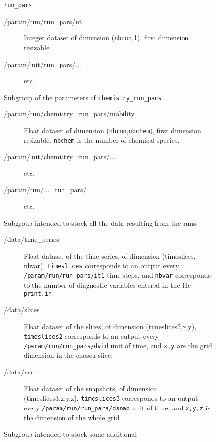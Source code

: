 \documentclass[a4paper,12pt]{article}
\begin{document}
\begin{figure}[p]
{\begin{description}
\begin{description}
\begin{description}
\begin{description}
        \texttt{run\_pars} 
        \begin{description}
        \item[/param/run/run\_pars/nt] Integer dataset of
            dimension (\texttt{nbrun},1), first dimension resizable
        \item[/param/init/run\_pars/...] etc.
        \end{description}
      \item[/param/run/chemistry\_run\_pars/] Subgroup of the
        parameters of \texttt{chemistry\_run\_pars} 
        \begin{description}
        \item[/param/run/chemistry\_run\_pars/mobility] Float dataset of
            dimension (\texttt{nbrun},\texttt{nbchem}), first
            dimension resizable. \texttt{nbchem} is the number of
            chemical species.
        \item[/param/init/chemistry\_run\_pars/...] etc.
      \item[/param/run/...\_run\_pars/] etc.
        \end{description}
      \end{description}
    \end{description}
  \item[/data/] Subgroup intended to stock all the data resulting from
    the runs.
    \begin{description}
    \item[/data/time\_series] Float dataset of the time series, of
      dimension (timeslices, nbvar),  \texttt{timeslices} corresponds
      to an output every \texttt{/param/run/run\_pars/it1} time
      steps, and \texttt{nbvar} corresponds to the number of
      diagnostic variables entered in the file \texttt{print.in}
    \item[/data/slices] Float dataset of the slices, of dimension
      (timeslices2,x,y), \texttt{timeslices2} corresponds to an output
      every \texttt{/param/run/run\_pars/dvid} unit of time, and
      \texttt{x,y} are the grid dimension in the chosen slice.
    \item[/data/var] Float dataset of the snapshots, of dimension
      (timeslices3,x,y,z), \texttt{timeslices3} corresponds to an
      output every  \texttt{/param/run/run\_pars/dsnap} unit of time,
      and \texttt{x,y,z} is the dimension of the whole grid
    \end{description}
  \item[/notes/] Subgroup intended to stock some additional

\end{description}
\end{description}}
\end{figure}
\end{document}
